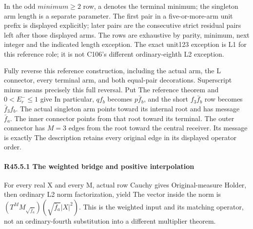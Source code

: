 In the odd \(minimum\ge 2\) row, a denotes the terminal minimum; the
singleton arm length is a separate parameter. The first pair in a five-or-more-arm
unit prefix is displayed explicitly; later pairs are the consecutive
strict residual pairs left after those displayed arms. The rows are
exhaustive by parity, minimum, next integer and the indicated length
exception. The exact unit123 exception is L1 for this reference role;
it is not C106's different ordinary-eighth L2 exception.

Fully reverse this reference construction, including the actual arm,
the L connector, every terminal arm, and both equal-pair decorations.
Superscript minus means precisely this full reversal. Put
The reference theorem and \(0<E_r^-\le 1\) give
In particular, \(qf_b\) becomes \(p\bar f_b\), and the short \(f_3\bar f_b\) row becomes
\(\bar f_3f_b\). The actual singleton arm points toward its internal root and
has message \(\bar f_a.\) The inner connector points from that root toward its
terminal. The outer connector has \(M=3\) edges from the root toward the
central receiver. Its message is exactly
The description retains every original edge in its displayed operator order.

\paragraph{R45.5.1 The weighted bridge and positive interpolation}

For every real X and every M, actual row Cauchy gives
Original-measure Holder, then ordinary L2 norm factorization, yield
The vector inside the norm is
\((T^M M_{\sqrt{\bar f_a}})(\sqrt{\bar f_a}|X|^2)\). This is the weighted input and its
matching operator, not an ordinary-fourth substitution into a different
multiplier theorem.

